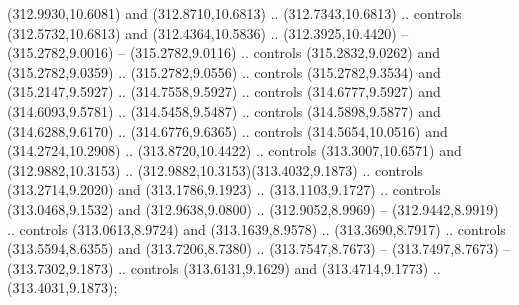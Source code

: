 (312.9930,10.6081) and (312.8710,10.6813) .. (312.7343,10.6813) .. controls (312.5732,10.6813) and (312.4364,10.5836) .. (312.3925,10.4420) -- (315.2782,9.0016) -- (315.2782,9.0116) .. controls (315.2832,9.0262) and (315.2782,9.0359) .. (315.2782,9.0556) .. controls (315.2782,9.3534) and (315.2147,9.5927) .. (314.7558,9.5927) .. controls (314.6777,9.5927) and (314.6093,9.5781) .. (314.5458,9.5487) .. controls (314.5898,9.5877) and (314.6288,9.6170) .. (314.6776,9.6365) .. controls (314.5654,10.0516) and (314.2724,10.2908) .. (313.8720,10.4422) .. controls (313.3007,10.6571) and (312.9882,10.3153) .. (312.9882,10.3153)(313.4032,9.1873) .. controls (313.2714,9.2020) and (313.1786,9.1923) .. (313.1103,9.1727) .. controls (313.0468,9.1532) and (312.9638,9.0800) .. (312.9052,8.9969) -- (312.9442,8.9919) .. controls (313.0613,8.9724) and (313.1639,8.9578) .. (313.3690,8.7917) .. controls (313.5594,8.6355) and (313.7206,8.7380) .. (313.7547,8.7673) -- (313.7497,8.7673) -- (313.7302,9.1873) .. controls (313.6131,9.1629) and (313.4714,9.1773) .. (313.4031,9.1873);
